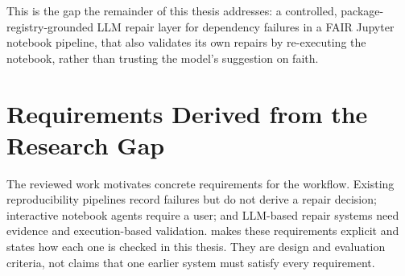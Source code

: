This is the gap the remainder of this thesis addresses: a controlled,
package-registry-grounded LLM repair layer for dependency failures in a FAIR
Jupyter notebook pipeline, that also validates its own repairs by
re-executing the notebook, rather than trusting the model's suggestion on
faith.

\section{Requirements Derived from the Research Gap}
\label{sec:rw-requirements}

The reviewed work motivates concrete requirements for the workflow. Existing
reproducibility pipelines record failures but do not derive a repair decision;
interactive notebook agents require a user; and LLM-based repair systems need
evidence and execution-based validation.  makes
these requirements explicit and states how each one is checked in this thesis.
They are design and evaluation criteria, not claims that one earlier system
must satisfy every requirement.

